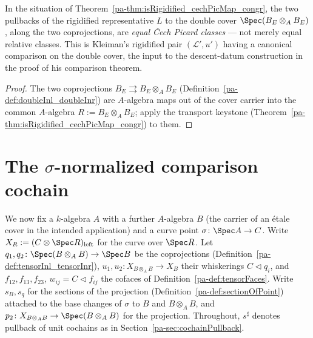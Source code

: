 \begin{theorem}
  \label{pa-thm:isRigidified_cechPicMap_doubleInl_eq_doubleInr}
  \leanok

  In the situation of Theorem~\ref{pa-thm:isRigidified_cechPicMap_congr}, the two pullbacks of
  the rigidified representative \(L\) to the double cover \(\Spec(B_E \otimes_A B_E)\), along
  the two coprojections, are \emph{equal \v Cech Picard classes} — not merely equal relative
  classes. This is Kleiman's rigidified pair \((\mathcal L', u')\) having a canonical comparison on
  the double cover, the input to the descent-datum construction in the proof of his
  comparison theorem.
\end{theorem}
\begin{proof}
  \leanok
  The two coprojections \(B_E \rightrightarrows B_E \otimes_A B_E\)
  (Definition~\ref{pa-def:doubleInl_doubleInr}) are \(A\)-algebra maps out of the cover carrier
  into the common \(A\)-algebra \(R := B_E \otimes_A B_E\); apply the transport keystone
  (Theorem~\ref{pa-thm:isRigidified_cechPicMap_congr}) to them.
\end{proof}

\section{The \texorpdfstring{\(\sigma\)}{sigma}-normalized comparison cochain}
\label{pa-sec:normalizedComparison}

We now fix a \(k\)-algebra \(A\) with a further \(A\)-algebra \(B\) (the carrier of an \'etale
cover in the intended application) and a curve point \(\sigma \colon \Spec A \to C\).
Write \(X_R := (C \otimes \Spec R)_{\mathrm{left}}\) for the curve over \(\Spec R\). Let
\(q_1, q_2 \colon \Spec(B \otimes_A B) \to \Spec B\) be the coprojections
(Definition~\ref{pa-def:tensorInl_tensorInr}), \(u_1, u_2 \colon X_{B \otimes_A B} \to X_B\) their
whiskerings \(C \lhd q_i\), and \(f_{12}, f_{13}, f_{23}\), \(w_{ij} = C \lhd f_{ij}\) the cofaces
of Definition~\ref{pa-def:tensorFaces}. Write \(s_B, s_q\) for the sections of the projection
(Definition~\ref{pa-def:sectionOfPoint}) attached to the base changes of \(\sigma\) to \(B\) and
\(B \otimes_A B\), and \(p_2 \colon X_{B \otimes_A B} \to \Spec(B \otimes_A B)\) for the
projection. Throughout, \(s^{\sharp}\) denotes pullback of unit cochains as in
Section~\ref{pa-sec:cochainPullback}.

